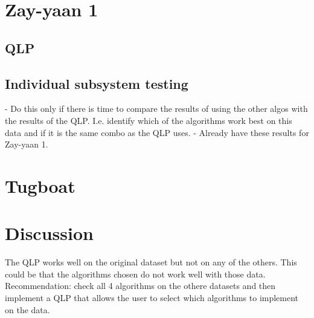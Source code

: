 \documentclass[class=report,11pt,crop=false]{standalone}
\begin{document}
\section{Zay-yaan 1}
\subsection{QLP}

\subsection{Individual subsystem testing}
- Do this only if there is time to compare the results of using the other algos with the results of the QLP. I.e. identify which of the algorithms work best on this data and if it is the same combo as the QLP uses. 
- Already have these results for Zay-yaan 1.

\section{Tugboat}

\section{Discussion}
The QLP works well on the original dataset but not on any of the others. This could be that the algorithms chosen do not work well with those data. Recommendation: check all 4 algorithms on the othere datasets and then implement a QLP that allows the user to select which algorithms to implement on the data.

\ifstandalone

\printnoidxglossary[type=\acronymtype,nonumberlist]
\fi
\end{document}
